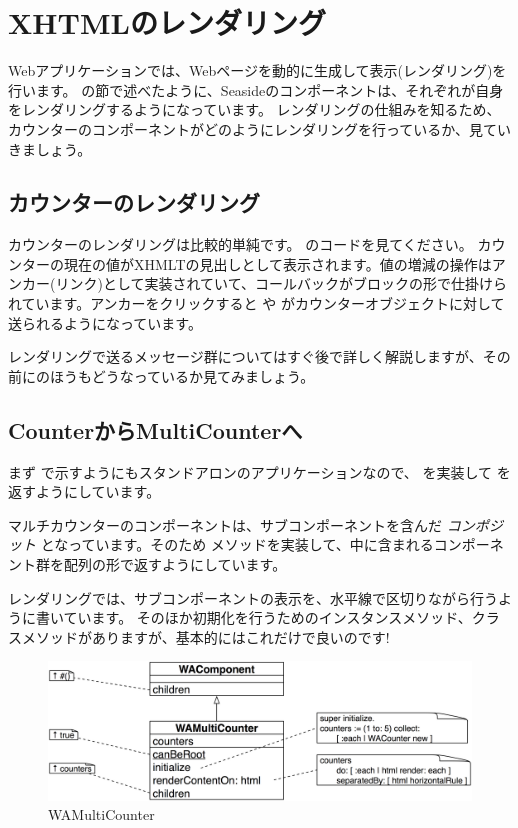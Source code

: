 \documentclass[a4paper,10pt,twoside]{book}
\begin{document}
\section{XHTMLのレンダリング}

Webアプリケーションでは、Webページを動的に生成して表示(レンダリング)を行います。 の節で述べたように、Seasideのコンポーネントは、それぞれが自身をレンダリングするようになっています。
レンダリングの仕組みを知るため、カウンターのコンポーネントがどのようにレンダリングを行っているか、見ていきましょう。

\subsection{カウンターのレンダリング}

カウンターのレンダリングは比較的単純です。 のコードを見てください。
カウンターの現在の値がXHMLTの見出しとして表示されます。値の増減の操作はアンカー(リンク)として実装されていて、コールバックがブロックの形で仕掛けられています。アンカーをクリックすると  や がカウンターオブジェクトに対して送られるようになっています。

レンダリングで送るメッセージ群についてはすぐ後で詳しく解説しますが、その前にのほうもどうなっているか見てみましょう。

\subsection{CounterからMultiCounterへ}

まず  で示すようにもスタンドアロンのアプリケーションなので、 を実装して を返すようにしています。

マルチカウンターのコンポーネントは、サブコンポーネントを含んだ \emph{コンポジット} となっています。そのため  メソッドを実装して、中に含まれるコンポーネント群を配列の形で返すようにしています。

レンダリングでは、サブコンポーネントの表示を、水平線で区切りながら行うように書いています。
そのほか初期化を行うためのインスタンスメソッド、クラスメソッドがありますが、基本的にはこれだけで良いのです!

\begin{figure}[bht]
\begin{center}
\includegraphics[width=\textwidth]{WAMultiCounter}
\caption{WAMultiCounter}
\end{center}
\end{figure}
\end{document}
